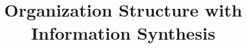 \documentclass{article}
\begin{document}
\title{Organization Structure with Information Synthesis}
\maketitle


\end{document}
